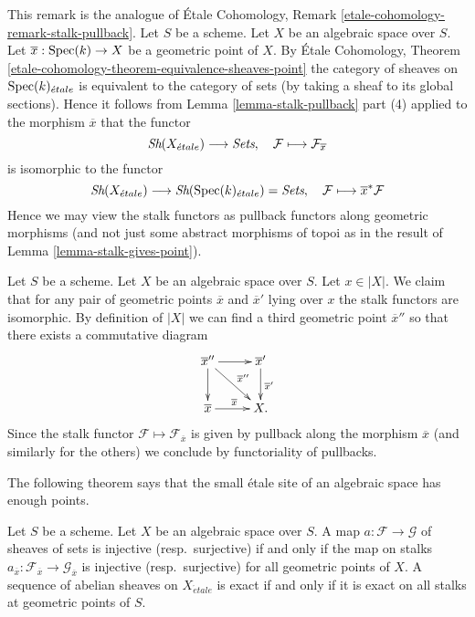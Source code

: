 \begin{remark}
\label{remark-stalk-pullback}
This remark is the analogue of
\'Etale Cohomology, Remark \ref{etale-cohomology-remark-stalk-pullback}.
Let $S$ be a scheme.
Let $X$ be an algebraic space over $S$.
Let $\overline{x} : \mathop{\rm Spec}(k) \to X$ be a geometric point of $X$.
By
\'Etale Cohomology,
Theorem \ref{etale-cohomology-theorem-equivalence-sheaves-point}
the category of sheaves on $\mathop{\rm Spec}(k)_{\acute{e}tale}$ is
equivalent to the category of sets (by taking a sheaf to its global sections).
Hence it follows from
Lemma \ref{lemma-stalk-pullback} part (4)
applied to the morphism $\overline{x}$ that the functor
$$
\mathop{\textit{Sh}}\nolimits(X_{\acute{e}tale}) \longrightarrow \textit{Sets}, \quad
\mathcal{F} \longmapsto \mathcal{F}_{\overline{x}}
$$
is isomorphic to the functor
$$
\mathop{\textit{Sh}}\nolimits(X_{\acute{e}tale})
\longrightarrow
\mathop{\textit{Sh}}\nolimits(\mathop{\rm Spec}(k)_{\acute{e}tale}) = \textit{Sets},
\quad
\mathcal{F} \longmapsto \overline{x}^*\mathcal{F}
$$
Hence we may view the stalk functors as pullback functors along
geometric morphisms (and not just some abstract morphisms of topoi
as in the result of
Lemma \ref{lemma-stalk-gives-point}).
\end{remark}

\begin{remark}
\label{remark-map-stalks}
Let $S$ be a scheme.
Let $X$ be an algebraic space over $S$.
Let $x \in |X|$.
We claim that for any pair of geometric points $\overline{x}$ and
$\overline{x}'$ lying over $x$ the stalk functors are isomorphic.
By definition of $|X|$ we can find a third geometric point
$\overline{x}''$ so that there exists a commutative diagram
$$
\xymatrix{
\overline{x}'' \ar[r] \ar[d] \ar[rd]^{\overline{x}''} &
\overline{x}' \ar[d]^{\overline{x}'} \\
\overline{x} \ar[r]^{\overline{x}} & X.
}
$$
Since the stalk functor $\mathcal{F} \mapsto \mathcal{F}_{\overline{x}}$
is given by pullback along the morphism $\overline{x}$ (and similarly for
the others) we conclude by functoriality of pullbacks.
\end{remark}




\noindent
The following theorem says that the small \'etale site of an algebraic
space has enough points.

\begin{theorem}
\label{theorem-exactness-stalks}
Let $S$ be a scheme. Let $X$ be an algebraic space over $S$.
A map $a : \mathcal{F} \to \mathcal{G}$ of sheaves of sets is injective
(resp.\ surjective) if and only if the map on stalks
$a_{\overline{x}} : \mathcal{F}_{\overline{x}} \to \mathcal{G}_{\overline{x}}$
is injective (resp.\ surjective) for all geometric points of $X$.
A sequence of abelian sheaves on $X_{\acute{e}tale}$ is exact
if and only if it is exact on all stalks at geometric points of $S$.
\end{theorem}

